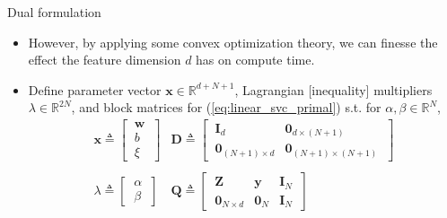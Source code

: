 \documentclass{beamer}
\numberwithin{equation}{section}
\newcommand{\aref}[1]{\alert{\ref{#1}}}
\begin{document}
\begin{frame}{Dual formulation}
    \begin{itemize}
        \item
        However, by applying some convex optimization theory, we can finesse
        the effect the feature dimension $ d $ has on compute time.

        \item
        Define parameter vector $ \mathbf{x} \in \mathbb{R}^{d + N + 1} $,
        Lagrangian [inequality] multipliers $ \lambda \in \mathbb{R}^{2N} $,
        and block matrices for (\aref{eq:linear_svc_primal})
        s.t. for $ \alpha, \beta \in \mathbb{R}^N $,
        \begin{equation} \label{eq:block_defs}
            \begin{array}{cc}
                \mathbf{x} \triangleq
                \begin{bmatrix}
                    \ \mathbf{w} \ \\
                    \ b \ \\
                    \ \xi \
                \end{bmatrix} &
	            \mathbf{D} \triangleq \begin{bmatrix}
	                \ \mathbf{I}_d & \mathbf{0}_{d \times (N + 1)} \ \\
	                \ \mathbf{0}_{(N + 1) \times d} &
	                \mathbf{0}_{(N + 1) \times (N + 1)} \
	            \end{bmatrix} \\ \\
	            \lambda \triangleq
                \begin{bmatrix} \ \alpha \ \\ \ \beta \ \end{bmatrix} &
	            \mathbf{Q} \triangleq \begin{bmatrix}
                    \ \mathbf{Z} & \mathbf{y} & \mathbf{I}_N \ \\
                    \ \mathbf{0}_{N \times d} & \mathbf{0}_N & \mathbf{I}_N \
	            \end{bmatrix}
            \end{array}
        \end{equation}


\end{itemize}
\end{frame}
\end{document}
